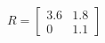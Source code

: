 \documentclass[preview]{standalone}
\begin{document}
\begin{align*}
R = \begin{bmatrix} 3.6 & 1.8 \\ 0 & 1.1 \end{bmatrix}
\end{align*}
\end{document}

